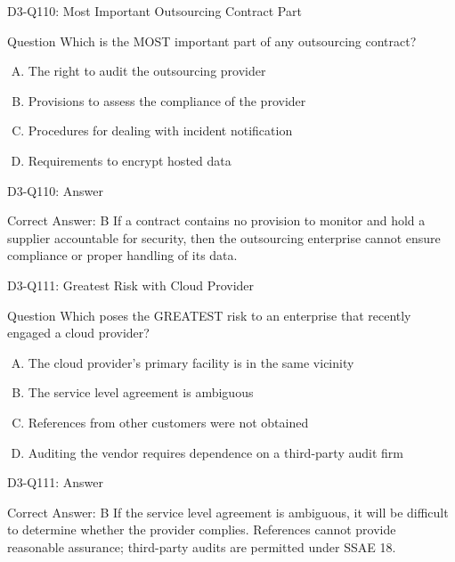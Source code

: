 \documentclass{beamer}
\begin{document}
	\begin{frame}{D3-Q110: Most Important Outsourcing Contract Part}
		\begin{block}{Question}
			Which is the MOST important part of any outsourcing contract?
		\end{block}
		\begin{enumerate}[(A)]
			\item The right to audit the outsourcing provider
			\item Provisions to assess the compliance of the provider
			\item Procedures for dealing with incident notification
			\item Requirements to encrypt hosted data
		\end{enumerate}
	\end{frame}
	\begin{frame}{D3-Q110: Answer}
		\begin{block}{Correct Answer: B}
			If a contract contains no provision to monitor and hold a supplier accountable for security, then the outsourcing enterprise cannot ensure compliance or proper handling of its data.
		\end{block}
	\end{frame}
	
	\begin{frame}{D3-Q111: Greatest Risk with Cloud Provider}
		\begin{block}{Question}
			Which poses the GREATEST risk to an enterprise that recently engaged a cloud provider?
		\end{block}
		\begin{enumerate}[(A)]
			\item The cloud provider's primary facility is in the same vicinity
			\item The service level agreement is ambiguous
			\item References from other customers were not obtained
			\item Auditing the vendor requires dependence on a third-party audit firm
		\end{enumerate}
	\end{frame}
	\begin{frame}{D3-Q111: Answer}
		\begin{block}{Correct Answer: B}
			If the service level agreement is ambiguous, it will be difficult to determine whether the provider complies. References cannot provide reasonable assurance; third-party audits are permitted under SSAE 18.
		\end{block}
	\end{frame}
	
\end{document}
